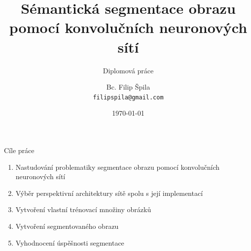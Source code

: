 \documentclass[aspectratio=1610]{beamer}
\title[Sémantická segmentace obrazu pomocí CNN]
{Sémantická segmentace obrazu pomocí konvolučních neuronových sítí}
\subtitle
{Diplomová práce}
\author[Bc. Filip Špila]
{Bc. Filip Špila \\
	\texttt{filipspila@gmail.com}}
\institute
{Ústav mechaniky těles, mechatroniky a biomechaniky \\
	Vysoké učení technické v Brně
}
\date{\today}
\begin{document}
	
	
	\begin{frame}
	\titlepage
\end{frame}


\begin{frame}{Cíle práce}
	\begin{enumerate}
		\item Nastudování problematiky segmentace obrazu pomocí konvolučních neuronových sítí
		\item Výběr perspektivní architektury sítě spolu s její implementací
		\item Vytvoření vlastní trénovací množiny obrázků
		\item Vytvoření segmentovaného obrazu
		\item Vyhodnocení úspěšnosti segmentace
	\end{enumerate}	
\end{frame}

\end{document}
